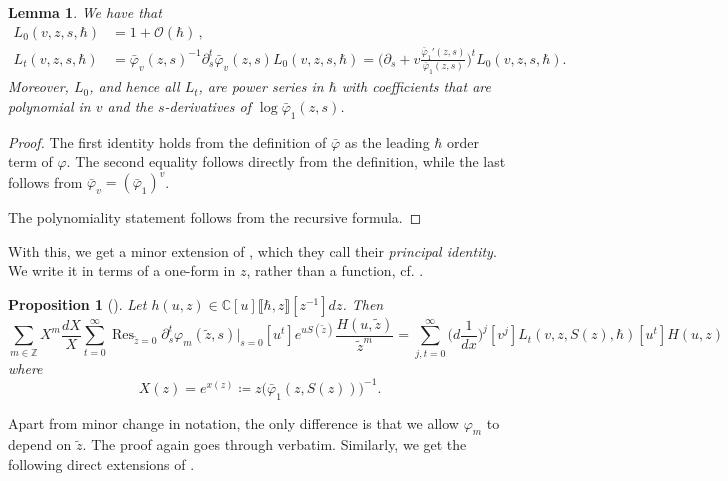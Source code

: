 \documentclass[10pt,a4paper,oneside,no-math,reqno]{amsart}%
\theoremstyle{plain}
\newtheorem{proposition}[theorem]{Proposition}
\newtheorem{lemma}[theorem]{Lemma}
\theoremstyle{definition}
\theoremstyle{remark}
\numberwithin{equation}{section}
\renewcommand{\phi}{\varphi}
\newcommand{\mb}[1]{\mathbb{#1}}
\newcommand{\mc}[1]{\mathcal{#1}}
\newcommand{\1}{\mathds{1}}
\newcommand{\C}{\mb{C}}
\newcommand{\Z}{\mb{Z}}
\newcommand{\<}{\langle}
\renewcommand{\>}{\rangle}
\newcommand{\del}{\partial}
\DeclareMathOperator*{\Res}{Res}
\begin{document}
\begin{lemma}
	We have that
	\begin{align}
		L_0(v,z,s,\hbar) 
		&= 
		1 + \mc{O} (\hbar) \,,
		\\
		L_t(v,z,s,\hbar)
		&=
		\bar{\phi}_v(z,s)^{-1} \del_s^t \bar{\phi}_v (z,s) L_0(v,z,s,\hbar)
		=
		\Big( \del_s + v \frac{\bar{\phi}_1' (z, s)}{\bar{\phi}_1 (z, s)} \Big)^t L_0 (v,z,s, \hbar) .
	\end{align}
	Moreover, $ L_0$, and hence all $ L_t$, are power series in $ \hbar$ with coefficients that are polynomial in $v$ and the $s$-derivatives of $ \log \bar{\phi}_1 (z, s)$.
\end{lemma}

\begin{proof}
	The first identity holds from the definition of $ \bar{\phi}$ as the leading $ \hbar$ order term of $ \phi$. The second equality follows directly from the definition, while the last follows from $ \bar{\phi}_v = (\bar{\phi}_1)^v$.\par
	The polynomiality statement follows from the recursive formula.
\end{proof}

With this, we get a minor extension of \cite[Proposition 4.3]{BDKS22}, which they call their \emph{principal identity}. We write it in terms of a one-form in $z$, rather than a function, cf. \cite[Proposition 4.4]{ABDKS24}.

\begin{proposition}[{\cite[Proposition 4.3]{BDKS22}}]
	Let $h(u, z) \in \C [u]\llbracket \hbar, z \rrbracket [z^{-1}] dz $. Then
	\begin{equation}
		\sum_{m \in \Z} X^m\frac{dX}{X} \sum_{t = 0}^\infty \Res_{\tilde{z} = 0} \del_s^t \phi_m (\tilde{z},s) \big|_{s = 0} [u^t] e^{u S(\tilde{z})} \frac{H(u,\tilde{z})}{\tilde{z}^m}
		=
		\sum_{j,t = 0}^\infty \big( d \frac{1}{dx} \big)^j [v^j] L_t(v, z, S(z),\hbar) [u^t] H(u,z)
	\end{equation}
	where
	\begin{equation}
		X(z)
        =
        e^{x(z)}
		\coloneqq
		z  \big( \bar{\phi}_1(z,S(z)) \big)^{-1} .
	\end{equation}
\end{proposition}

Apart from minor change in notation, the only difference is that we allow $ \phi_m$ to depend on $ \tilde{z}$. The proof again goes through verbatim. Similarly, we get the following direct extensions of \cite[Corollary 4.4, Theorem 4.8, Corollary 4.10]{BDKS22}.
\end{document}
